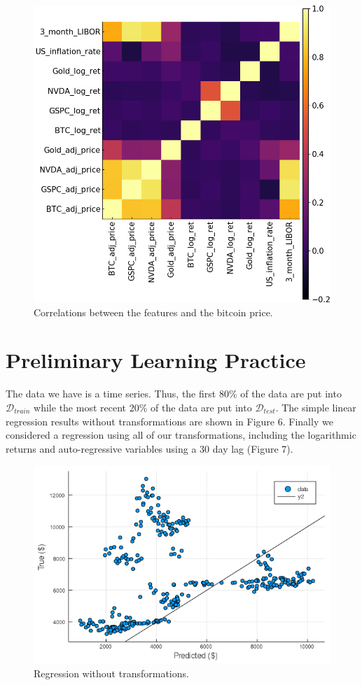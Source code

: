\documentclass[9pt,twocolumn,twoside]{ilcss}
\begin{document}
\begin{figure}[tbhp]
\centering
\includegraphics[width=0.8\linewidth]{heatmap.png}
\caption{Correlations between the features and the bitcoin price.}
\label{fig:5}
\end{figure}

\section{Preliminary Learning Practice}
The data we have is a time series. Thus, the first 80\% of the data are put into $\mathcal{D}_{train}$ while the most recent 20\% of the data are put into $\mathcal{D}_{test}$. The simple linear regression results without transformations are shown in Figure 6. Finally we considered a regression using all of our transformations, including the logarithmic returns and auto-regressive variables using a 30 day lag (Figure 7).

\begin{figure}[tbhp]
\centering
\includegraphics[width=1.0\linewidth]{Regression_wo_all_explanatory.png}
\caption{Regression without transformations.}
\label{fig:9}
\end{figure}
\end{document}
